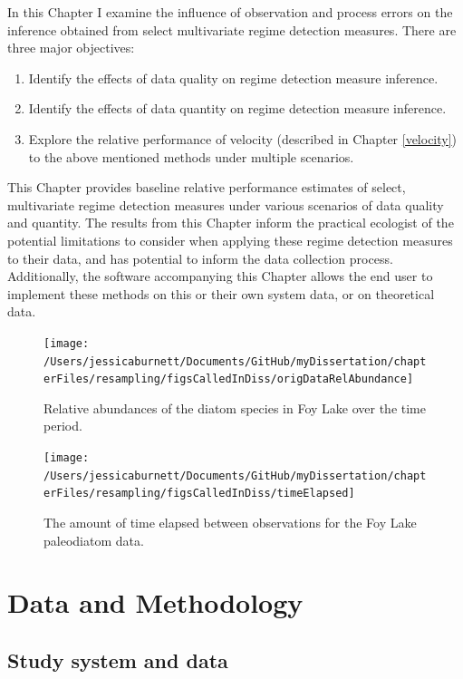 \documentclass[12pt,twoside,openany]{reedthesis}
\providecommand{\tightlist}{%
  \setlength{\itemsep}{0pt}\setlength{\parskip}{0pt}}
\begin{document}
In this Chapter I examine the influence of observation and process errors on the inference obtained from select multivariate regime detection measures. There are three major objectives:
\begin{enumerate}
\def\labelenumi{\arabic{enumi}.}
\tightlist
\item
  Identify the effects of data quality on regime detection measure inference.
\item
  Identify the effects of data quantity on regime detection measure inference.
\item
  Explore the relative performance of velocity (described in Chapter \ref{velocity}) to the above mentioned methods under multiple scenarios.
\end{enumerate}
This Chapter provides baseline relative performance estimates of select, multivariate regime detection measures under various scenarios of data quality and quantity. The results from this Chapter inform the practical ecologist of the potential limitations to consider when applying these regime detection measures to their data, and has potential to inform the data collection process. Additionally, the software accompanying this Chapter allows the end user to implement these methods on this or their own system data, or on theoretical data.
\begin{figure}
\texttt{[image: /Users/jessicaburnett/Documents/GitHub/myDissertation/chapterFiles/resampling/figsCalledInDiss/origDataRelAbundance]} \caption{Relative abundances of the diatom species in Foy Lake over the time period.}\label{fig:origDat}
\end{figure}
\begin{figure}
\texttt{[image: /Users/jessicaburnett/Documents/GitHub/myDissertation/chapterFiles/resampling/figsCalledInDiss/timeElapsed]} \caption{The amount of time elapsed between observations for the Foy Lake paleodiatom data.}\label{fig:timeElapsed}
\end{figure}
\hypertarget{data-and-methodology}{%
\section{Data and Methodology}\label{data-and-methodology}}

\hypertarget{study-system-and-data}{%
\subsection{Study system and data}\label{study-system-and-data}}
\end{document}
